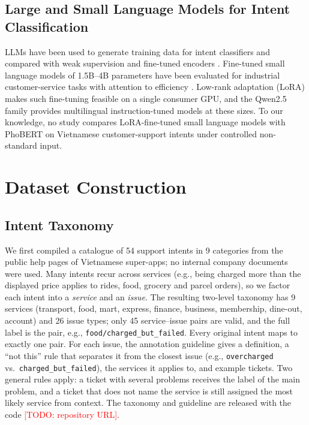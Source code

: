 \documentclass[conference]{IEEEtran}
\newcommand{\TODO}[1]{\textcolor{red}{[TODO: #1]}}
\begin{document}
\subsection{Large and Small Language Models for Intent Classification}
LLMs have been used to generate training data for intent classifiers
\cite{benayas2024enhancing, madrueno2025novel} and compared with
weak supervision \cite{alexander2025few} and fine-tuned encoders
\cite{ouaddi2025assessing}. Fine-tuned small language models of 1.5B--4B
parameters have been evaluated for industrial customer-service tasks with
attention to efficiency \cite{pai2026finetuning}. Low-rank adaptation (LoRA)
\cite{hu2022lora} makes such fine-tuning feasible on a single consumer GPU,
and the Qwen2.5 family \cite{qwen2024qwen25} provides multilingual
instruction-tuned models at these sizes. To our knowledge, no study compares
LoRA-fine-tuned small language models with PhoBERT on Vietnamese
customer-support intents under controlled non-standard input.

\section{Dataset Construction}
\label{sec:dataset}

\subsection{Intent Taxonomy}
We first compiled a catalogue of 54 support intents in 9 categories from
the public help pages of Vietnamese super-apps; no internal company
documents were used. Many intents recur across services (e.g., being
charged more than the displayed price applies to rides, food, grocery and
parcel orders), so we factor each intent into a \emph{service} and an
\emph{issue}. The resulting two-level taxonomy has 9 services
(transport, food, mart, express, finance, business, membership, dine-out,
account) and 26 issue types; only 45 service--issue pairs are valid, and
the full label is the pair, e.g., \texttt{food/charged\_but\_failed}. Every
original intent maps to exactly one pair. For each issue, the annotation
guideline gives a definition, a ``not this'' rule that separates it from the
closest issue (e.g., \texttt{overcharged} vs.\ \texttt{charged\_but\_failed}),
the services it applies to, and example tickets. Two general rules apply:
a ticket with several problems receives the label of the main problem, and
a ticket that does not name the service is still assigned the most likely
service from context. The taxonomy and guideline are released with the
code \TODO{repository URL}.
\end{document}

